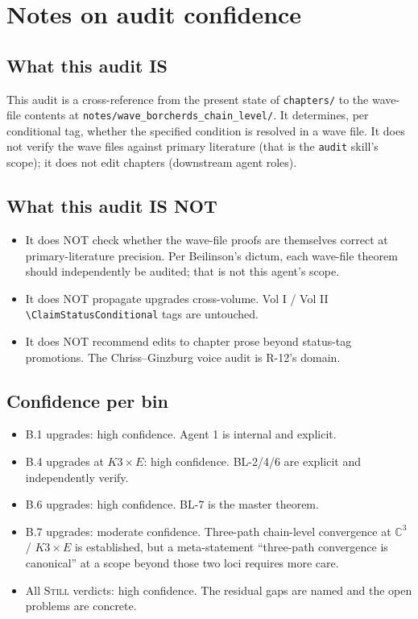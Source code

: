 \documentclass[11pt]{amsart}
\providecommand{\C}{\mathbb{C}}
\begin{document}
{{%
\section{Notes on audit confidence}
\label{sec:audit-confidence}

\subsection{What this audit IS}
This audit is a cross-reference from the present state of
\texttt{chapters/} to the wave-file contents at
\texttt{notes/wave\_borcherds\_chain\_level/}. It determines, per
conditional tag, whether the specified condition is resolved in a
wave file. It does not verify the wave files against primary
literature (that is the \texttt{audit} skill's scope); it does not
edit chapters (downstream agent roles).

\subsection{What this audit IS NOT}
\begin{itemize}
\item It does NOT check whether the wave-file proofs are themselves
  correct at primary-literature precision. Per Beilinson's dictum,
  each wave-file theorem should independently be audited; that is
  not this agent's scope.
\item It does NOT propagate upgrades cross-volume. Vol I / Vol II
  \texttt{\textbackslash ClaimStatusConditional} tags are untouched.
\item It does NOT recommend edits to chapter prose beyond status-tag
  promotions. The Chriss--Ginzburg voice audit is R-12's domain.
\end{itemize}

\subsection{Confidence per bin}
\begin{itemize}
\item B.1 upgrades: high confidence. Agent 1 is internal and explicit.
\item B.4 upgrades at $K3 \times E$: high confidence. BL-2/4/6 are
  explicit and independently verify.
\item B.6 upgrades: high confidence. BL-7 is the master theorem.
\item B.7 upgrades: moderate confidence. Three-path chain-level
  convergence at $\C^3$ / $K3 \times E$ is established, but a
  meta-statement ``three-path convergence is canonical'' at a
  scope beyond those two loci requires more care.
\item All \textsc{Still} verdicts: high confidence. The residual
  gaps are named and the open problems are concrete.
\end{itemize}

}}
\end{document}
